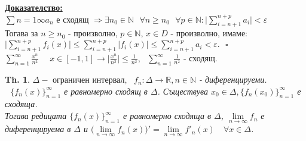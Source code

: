 \documentclass[12pt]{article}
\newcommand{\halfbox}[1]{\rbbox{#1}\quad}
\newtheorem{theorem}{Th.}
\newcommand{\spc}{\text{ }}
\begin{document}
	\textbf{\underline{Доказателство:}}
	\\
	$\sum{n=1}{\infty}a_n$ е сходящ $\Rightarrow \exists n_0 \in \mathbb{N} \spc\forall n \geq n_0 \spc\forall p \in \mathbb{N} : \big|\textstyle{\sum_{i=n+1}^{n+p}a_i}\big|<\varepsilon$\\
	Тогава за $n\geq n_0$ - произволно, $p \in \mathbb{N}$, $x\in D$ - произволно, имаме:\\
	$\big|\textstyle{\sum_{i=n+1}^{n+p}f_i(x)}\big|\leq \sum_{i=n+1}^{n+p}\big|f_i(x)\big|\leq \sum_{i=n+1}^{n+p}a_i < \varepsilon.\spc\square$\\
	\halfbox{Пример} $\sum_{n=1}^{\infty}\frac{x^n}{n^2}$
	$\quad x\in [-1,1]\longrightarrow \big|\frac{x^n}{n^2}\big|\leq \frac{1}{n^2},\spc \sum_{n=1}^{\infty}\frac{1}{n^2}$ - сходящ.
	\begin{theorem}
		$\Delta - \text{ ограничен интервал},\spc f_n : \Delta \rightarrow \mathbb{R}, n\in\mathbb{N}$ - диференцируеми. $\spc \{f_n(x)\}_{n=1}^{\infty}$ е равномерно сходящ в $\Delta$. Съществува $x_0 \in \Delta, \{f_n(x_0)\}_{n=1}^{\infty}$ е сходяща.\\
		Тогава редицата $\{f_n(x)\}_{n=1}^{\infty}$ е равномерно сходяща в $\Delta$, $\lim\limits_{n\to\infty}f_n$ е диференцируема в $\Delta$ и $\big(\lim\limits_{n\to\infty}f_n(x)\big)' = \lim\limits_{n\to\infty}f'_n(x)\quad \forall x \in \Delta$.
	\end{theorem}
	
\end{document}

